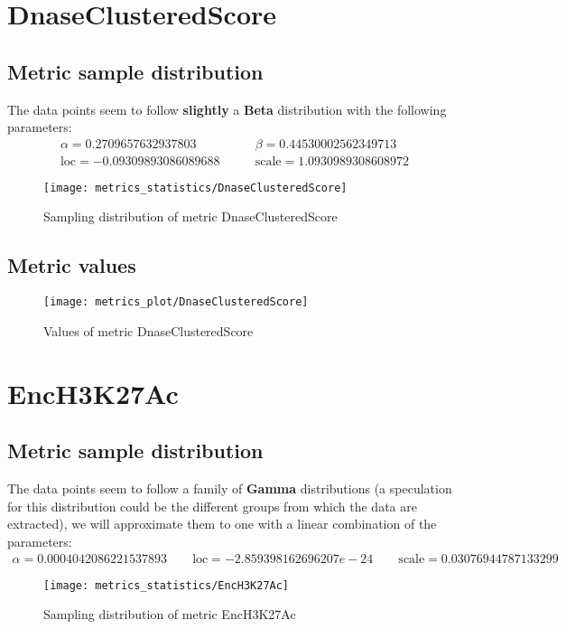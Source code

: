 \clearpage
\section{DnaseClusteredScore}
\subsection{Metric sample distribution}
The data points seem to follow \textbf{slightly} a \textbf{Beta} distribution with the following parameters:
\begin{align*}
	\alpha   = 0.2709657632937803     & \qquad  \beta = 0.44530002562349713      \\
	\text{loc} = -0.09309893086089688 & \qquad \text{scale} = 1.0930989308608972
\end{align*}

\begin{figure}
	\texttt{[image: metrics\_statistics/DnaseClusteredScore]}
	\caption{Sampling distribution of metric DnaseClusteredScore}
\end{figure}
\subsection{Metric values}
\begin{figure}
	\texttt{[image: metrics\_plot/DnaseClusteredScore]}
	\caption{Values of metric DnaseClusteredScore}
\end{figure}

\clearpage
\section{EncH3K27Ac}
\subsection{Metric sample distribution}
The data points seem to follow a family of \textbf{Gamma} distributions (a speculation for this distribution could be the different groups from which the data are extracted), we will approximate them to one with a linear combination of the parameters:
\begin{align*}
	\alpha   = 0.0004042086221537893    \qquad  \text{loc} = -2.859398162696207e-24 \qquad \text{scale} = 0.03076944787133299
\end{align*}
\begin{figure}
	\texttt{[image: metrics\_statistics/EncH3K27Ac]}
	\caption{Sampling distribution of metric EncH3K27Ac}
\end{figure}
